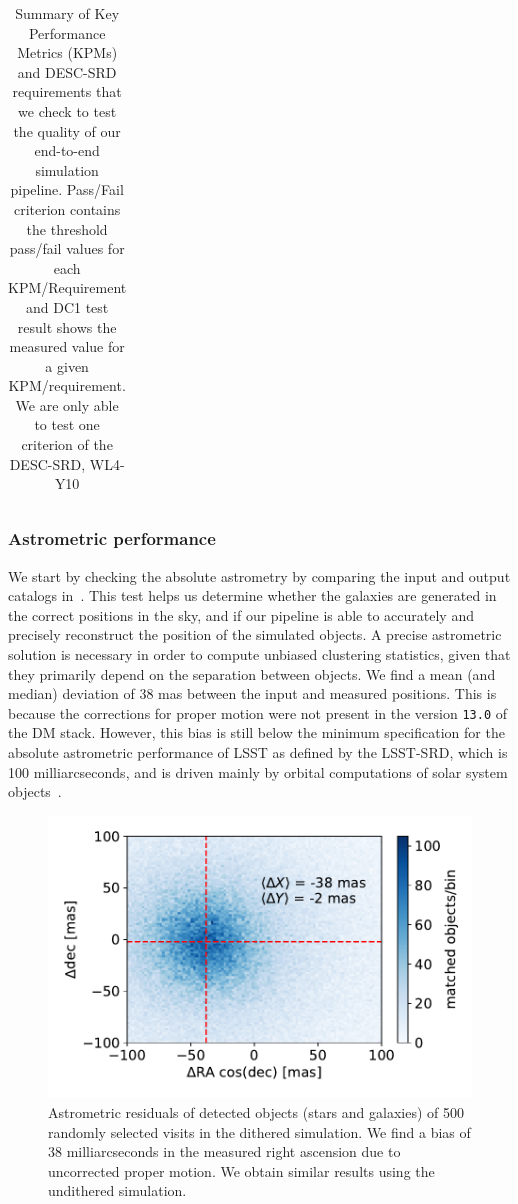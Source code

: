 \documentclass[\docopts]{\docclass}
\begin{document}
\begin{table}
\begin{tabular}{|c|c|c|c|c|c|}
\end{tabular}
\caption{Summary of Key Performance Metrics (KPMs) and DESC-SRD requirements that we check to test the quality of our end-to-end simulation pipeline. Pass/Fail criterion contains the threshold pass/fail values for each KPM/Requirement and DC1 test result shows the measured value for a given KPM/requirement. We are only able to test one criterion of the DESC-SRD, WL4-Y10} %
\label{tab:kpm_table}
\end{table}

\subsubsection{Astrometric performance}
\label{sssec:astrometry}
We start by checking the absolute astrometry by comparing the input and output catalogs in~. This test helps us determine whether the galaxies are generated in the correct positions in the sky, and if our pipeline is able to accurately and precisely reconstruct the position of the simulated objects. A precise astrometric solution is necessary in order to compute unbiased clustering statistics, given that they primarily depend on the separation between objects. We find a mean (and median) deviation of 38 mas between the input and measured positions. This is because the corrections for proper motion were not present in the version \texttt{13.0} of the DM stack. However, this bias is still below the minimum specification for the absolute astrometric performance of LSST as defined by the LSST-SRD, which is 100 milliarcseconds, and is driven mainly by orbital computations of solar system objects~\citep{LPM-17}. 

\begin{figure}
\centering
\includegraphics[width=0.9\columnwidth]{astrometric_residuals_single_visit_2d}
\caption{Astrometric residuals of detected objects (stars and galaxies) of 500 randomly selected visits in the dithered simulation. We find a bias of 38 milliarcseconds in the measured right ascension due to uncorrected proper motion. We obtain similar results using the undithered simulation.}
\label{fig:AA1}
\end{figure}
\end{document}
